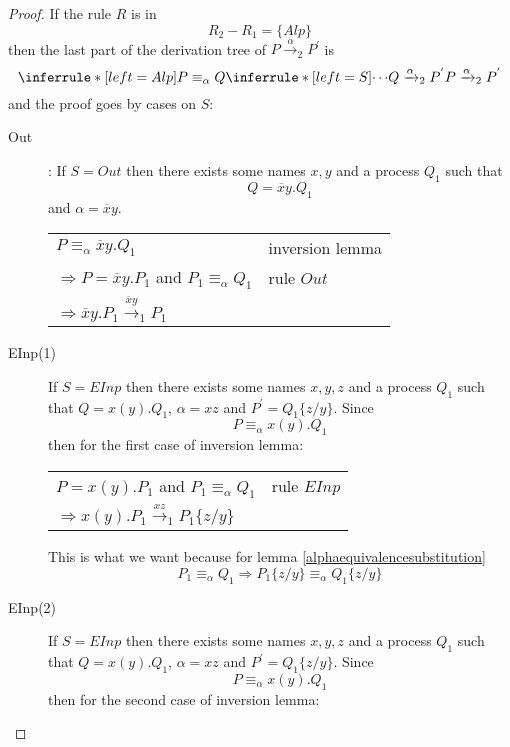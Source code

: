 \begin{theorem}
\begin{proof}
	If the rule $R$ is in 
	\[
	  R_{2}-R_{1}=\{Alp\}
	\]
	then the last part of the derivation tree of $P\xrightarrow{\alpha}_{2}P^{'}$ is
	\[
	  \inferrule* [left=Alp]{
	      P\equiv_{\alpha}Q
	    \\
	      \inferrule* [left=S]{
		\cdots
	      }{
		Q\xrightarrow{\alpha}_{2}P^{'}
	      }
	  }{
	    P\xrightarrow{\alpha}_{2}P^{'}
	  }
	\]
	and the proof goes by cases on $S$:
	\begin{description}
	  \item[Out]:
	    If $S=Out$ then there exists some names $x,y$ and a process $Q_{1}$ such that 
	    \[
	      Q=\overline{x}y.Q_{1}
	    \]
	    and $\alpha=\overline{x}y$. 
 	    \begin{center}
 	      \begin{tabular}{ll}
 		$P\equiv_{\alpha}\overline{x}y.Q_{1}$&inversion lemma\\
 		$\Rightarrow P=\overline{x}y.P_{1}$ and $P_{1}\equiv_{\alpha}Q_{1}$&rule $Out$\\
 		$\Rightarrow \overline{x}y.P_{1}\xrightarrow{\overline{x}y}_{1}P_{1}$&\\
 	      \end{tabular}
 	    \end{center}
	  \item[EInp(1)]
	    If $S=EInp$ then there exists some names $x,y,z$ and a process $Q_{1}$ such that $Q=x(y).Q_{1}$, $\alpha=xz$ and $P^{'}=Q_{1}\{z/y\}$. Since 
	    \[
	      P\equiv_{\alpha}x(y).Q_{1}
	    \]
	    then for the first case of inversion lemma:
		\begin{center}
		  \begin{tabular}{ll}
		    $P=x(y).P_{1}$ and $P_{1}\equiv_{\alpha}Q_{1}$& rule $EInp$\\
		    $\Rightarrow x(y).P_{1}\xrightarrow{xz}_{1}P_{1}\{z/y\}$& \\
		  \end{tabular}
		\end{center}
		This is what we want because for lemma \ref{alphaequivalencesubstitution}
		\[
		  P_{1}\equiv_{\alpha}Q_{1}\Rightarrow P_{1}\{z/y\}\equiv_{\alpha}Q_{1}\{z/y\}
		\]
	  \item[EInp(2)]
	    If $S=EInp$ then there exists some names $x,y,z$ and a process $Q_{1}$ such that $Q=x(y).Q_{1}$, $\alpha=xz$ and $P^{'}=Q_{1}\{z/y\}$. Since 
	    \[
	      P\equiv_{\alpha}x(y).Q_{1}
	    \]
	    then for the second case of inversion lemma:


\end{description}
\end{proof}
\end{theorem}
